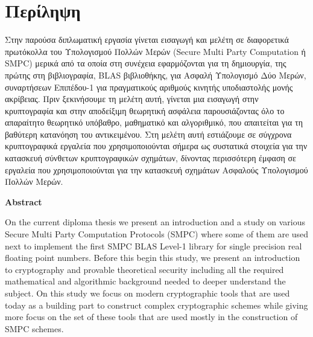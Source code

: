 \chapter*{Περίληψη}

\pagestyle{plain}

Στην παρούσα διπλωματική εργασία γίνεται εισαγωγή και μελέτη σε διαφορετικά πρωτόκολλα του Υπολογισμού Πολλών Μερών (Secure Multi Party Computation ή SMPC) μερικά από τα οποία στη συνέχεια εφαρμόζονται για τη δημιουργία, της πρώτης στη βιβλιογραφία, BLAS βιβλιοθήκης, για Ασφαλή Υπολογισμό Δύο Μερών, συναρτήσεων Επιπέδου-1 για πραγματικούς αριθμούς κινητής υποδιαστολής μονής ακρίβειας. Πριν ξεκινήσουμε τη μελέτη αυτή, γίνεται μια εισαγωγή στην κρυπτογραφία και στην αποδείξιμη θεωρητική ασφάλεια παρουσιάζοντας όλο το απαραίτητο θεωρητικό υπόβαθρο, μαθηματικό και αλγοριθμικό, που απαιτείται για τη βαθύτερη κατανόηση του αντικειμένου. Στη μελέτη αυτή εστιάζουμε σε σύγχρονα κρυπτογραφικά εργαλεία που χρησιμοποιούνται σήμερα ως συστατικά στοιχεία για την κατασκευή σύνθετων κρυπτογραφικών σχημάτων, δίνοντας περισσότερη έμφαση σε εργαλεία που χρησιμοποιούνται για την κατασκευή σχημάτων Ασφαλούς Υπολογισμού Πολλών Μερών.

\vspace{0.3cm}

\begin{flushleft}
\huge\textbf{Abstract}
\end{flushleft}

On the current diploma thesis we present an introduction and a study on various Secure Multi Party Computation Protocols (SMPC) where some of them are used next to implement the first SMPC BLAS Level-1 library for single precision real floating point numbers. Before this begin this study, we present an introduction to cryptography and provable theoretical security including all the required mathematical and algorithmic background needed to deeper understand the subject. On this study we focus on modern cryptographic tools that are used today as a building part to construct complex cryptographic schemes while giving more focus on the set of these tools that are used mostly in the construction of SMPC schemes.